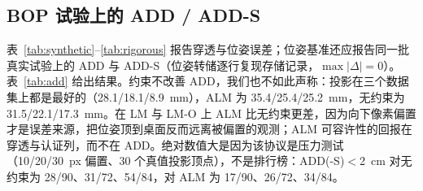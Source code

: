 \begin{table}[t]
\centering
\caption{UTIAS In-The-Dark，`run\_000000`，每格 $n=38$（旋转/平移 RMSE 中位；比率为 38 上的比例）。}
\label{tab:utias}
\scriptsize
\setlength{\tabcolsep}{2.2pt}
\end{table}

\subsection{BOP 试验上的 ADD / ADD-S}\label{sec:add}
表~\ref{tab:synthetic}--\ref{tab:rigorous} 报告穿透与位姿误差；位姿基准还应报告同一批真实试验上的 ADD 与 ADD-S（位姿转储逐行复现存储记录，$\max|\Delta|=0$）。表~\ref{tab:add} 给出结果。约束不改善 ADD，我们也不如此声称：投影在三个数据集上都是最好的（28.1/18.1/8.9~mm），ALM 为 35.4/25.4/25.2~mm，无约束为 31.5/22.1/17.3~mm。在 LM 与 LM-O 上 ALM 比无约束更差，因为向下像素偏置才是误差来源，把位姿顶到桌面反而远离被偏置的观测；ALM 可容许性的回报在穿透与认证列，而不在 ADD。绝对数值大是因为该协议是压力测试（10/20/30~px 偏置、30 个真值投影顶点），不是排行榜：ADD(-S)$<$2~cm 对无约束为 28/90、31/72、54/84，对 ALM 为 17/90、26/72、34/84。

